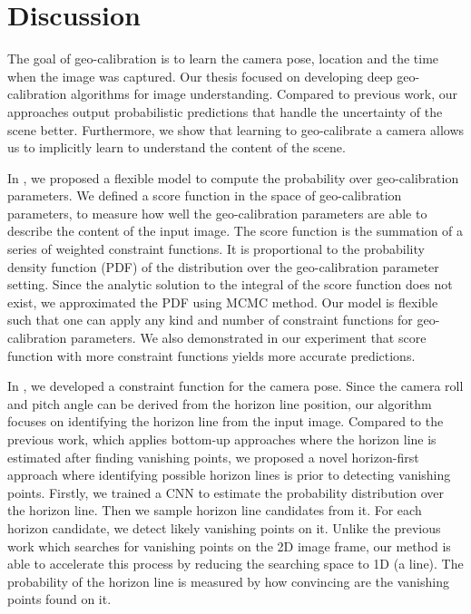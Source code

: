 \chapter{Discussion}
\label{chap:discussion}

The goal of geo-calibration is to learn the camera pose, location and
the time when the image was captured.
Our thesis focused on developing deep geo-calibration algorithms for
image understanding.
Compared to previous work, our approaches output probabilistic
predictions that handle the uncertainty of the scene
better. Furthermore, we show that
learning to geo-calibrate a camera allows us to implicitly learn to
understand the content of the scene.


In , we proposed a flexible model to compute the
probability over geo-calibration parameters. We defined a score
function in the space of geo-calibration parameters, to measure how
well the geo-calibration parameters are able to describe the content
of the input image.
The score function is the summation of a series of weighted
constraint functions. It is proportional to the probability density
function (PDF) of the distribution over the geo-calibration parameter setting.
Since the analytic solution to the
integral of the score function does not exist, we approximated the
PDF using MCMC method. Our model is flexible such that one can apply
any kind and number of constraint functions for geo-calibration
parameters. We also demonstrated in our experiment that 
score function with more constraint functions yields more accurate
predictions.

In , we developed a constraint function for the
camera pose. Since the camera roll and pitch angle can be derived from
the horizon line position, our algorithm focuses on identifying the
horizon line from the input image.
Compared to the previous work, which applies bottom-up
approaches where the horizon line is estimated after finding vanishing
points, we proposed a novel horizon-first approach where
identifying possible horizon lines is prior to detecting vanishing
points. 
Firstly, we trained a CNN to estimate the probability distribution
over the horizon line. Then we sample horizon line candidates from
it. For each horizon candidate, we detect likely
vanishing points on it. Unlike the previous work which searches for
vanishing points on the 2D image frame, our method is able to
accelerate this process by reducing the searching space to
1D (a line). The probability of the horizon line is measured by how
convincing are the vanishing points found on it. 

